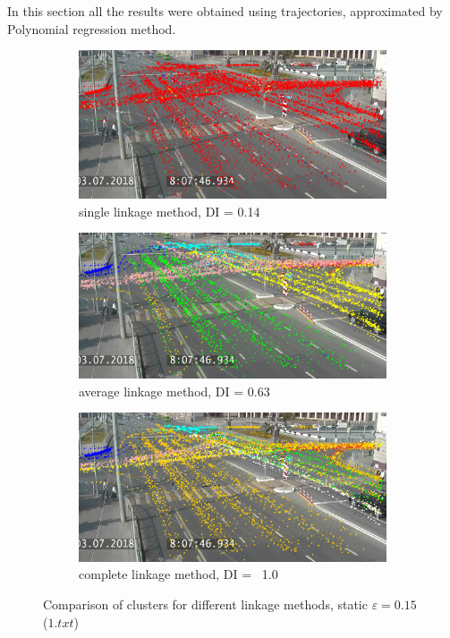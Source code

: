 In this section all the results were obtained using trajectories, approximated by Polynomial regression method.

\begin{figure}[!htb]
	\centering
	\begin{subfigure}[!htb]{0.3\textwidth}
		\centering{}
		\includegraphics[width=\textwidth]{images/link_meth_comp_stat_min.png}
		\caption{single linkage method, DI = 0.14}
		\label{fig:link-meth-comp-stat-min}
	\end{subfigure}
	\hfill
	\begin{subfigure}[!htb]{0.3\textwidth}
		\centering{}
		\includegraphics[width=\textwidth]{images/link_meth_comp_stat_avg.png}
		\caption{average linkage method, DI = 0.63}
		\label{fig:link-meth-comp-stat-avg}
	\end{subfigure}
	\hfill
	\begin{subfigure}[!htb]{0.3\textwidth}
		\centering{}
		\includegraphics[width=\textwidth]{images/link_meth_comp_stat_max.png}
		\caption{complete linkage method, DI = ~1.0}
		\label{fig:link-meth-comp-stat-max}
	\end{subfigure}
	\caption{Comparison of clusters for different linkage methods, static $\varepsilon = 0.15$ ($1.txt$)}
	\label{fig:link-meth-comp-stat}
\end{figure}

